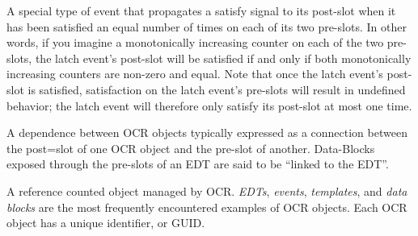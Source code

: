 \glossarydefstart
A special type of event that propagates a satisfy signal to its post-slot
when it has been satisfied an equal number of times on each of its two
pre-slots. In other words, if you imagine a
monotonically increasing counter on each of the two pre-slots, the
latch event's post-slot will be satisfied if and only if both monotonically
increasing counters are non-zero and equal. Note that once the latch
event's post-slot is satisfied, satisfaction on the latch event's
pre-slots will result in undefined behavior; the latch event will
therefore only satisfy its post-slot at most one time.
\glossarydefend

%
%

%
%


\glossarydefstart
A dependence between OCR objects typically expressed as a connection
between the post=slot of one OCR object and the pre-slot of another.  Data-Blocks
exposed through the pre-slots of an EDT are said to be ``linked to the EDT''.
\glossarydefend


\glossarydefstart
A reference counted object managed by OCR. \emph{EDTs}, \emph{events},
\emph{templates}, and \emph{data blocks} are the most frequently
encountered examples of OCR objects. Each OCR object has a unique
identifier, or GUID.
\glossarydefend

